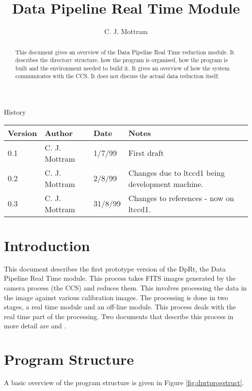 \documentclass[10pt,a4paper]{article}
\title{Data Pipeline Real Time Module}
\author{C. J. Mottram}
\date{}
\begin{document}
\thispagestyle{empty}
\maketitle
\begin{abstract}
This document gives an overview of the Data Pipeline Real Time reduction module. It describes the directory structure,
how the program is organised, how the program is built and the environment needed to build it. It gives an overview
of how the system communicates with the CCS. It does not discuss the actual data reduction itself.
\end{abstract}

\centerline{\Large History}
\begin{center}
\begin{tabular}{|l|l|l|p{15em}|}
\hline
{\bf Version} & {\bf Author} & {\bf Date} & {\bf Notes} \\
\hline
0.1 &              C. J. Mottram & 1/7/99 & First draft \\
0.2 &              C. J. Mottram & 2/8/99 & Changes due to ltccd1 being development machine. \\
0.3 &              C. J. Mottram & 31/8/99 & Changes to references - now on ltccd1. \\
\hline
\end{tabular}
\end{center}

\newpage
\tableofcontents
\listoffigures
\listoftables
\newpage

\section{Introduction}
This document describes the first prototype version of the DpRt, the Data Pipeline Real Time module. This process
takes FITS images generated by the camera process (the CCS) and reduces them. This involves processing the data
in the image against various calibration images. The processing is done in two stages, a  real time
module and an off-line module. This process deals with the real time part of the processing. 
Two documents that describe this process in more detail are \cite{bib:ltpf} and \cite{bib:drpl}.

\section{Program Structure}
A basic overview of the program structure is given in Figure \ref{fig:dprtprogstruct}.
\end{document}
